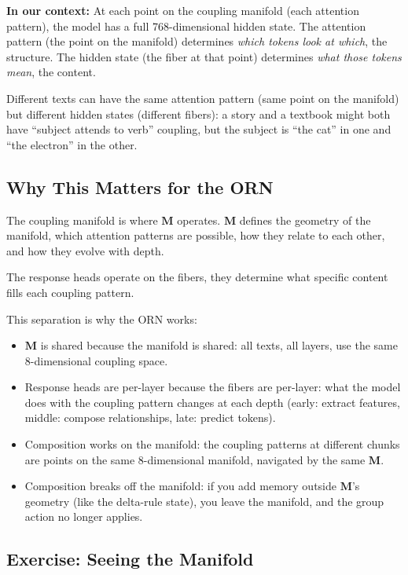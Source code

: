 \documentclass[11pt, a4paper]{article}
\newcommand{\M}{\mathbf{M}}
\theoremstyle{remark}
\begin{document}
\textbf{In our context:}
At each point on the coupling manifold (each attention pattern), the model has a full 768-dimensional hidden state.
The attention pattern (the point on the manifold) determines \emph{which tokens look at which}, the structure.
The hidden state (the fiber at that point) determines \emph{what those tokens mean}, the content.

Different texts can have the same attention pattern (same point on the manifold) but different hidden states (different fibers): a story and a textbook might both have ``subject attends to verb'' coupling, but the subject is ``the cat'' in one and ``the electron'' in the other.

\subsection{Why This Matters for the ORN}

The coupling manifold is where $\M$ operates.
$\M$ defines the geometry of the manifold, which attention patterns are possible, how they relate to each other, and how they evolve with depth.

The response heads operate on the fibers, they determine what specific content fills each coupling pattern.

This separation is why the ORN works:
\begin{itemize}[nosep]
    \item $\M$ is shared because the manifold is shared: all texts, all layers, use the same 8-dimensional coupling space.
    \item Response heads are per-layer because the fibers are per-layer: what the model does with the coupling pattern changes at each depth (early: extract features, middle: compose relationships, late: predict tokens).
    \item Composition works on the manifold: the coupling patterns at different chunks are points on the same 8-dimensional manifold, navigated by the same $\M$.
    \item Composition breaks off the manifold: if you add memory outside $\M$'s geometry (like the delta-rule state), you leave the manifold, and the group action no longer applies.
\end{itemize}

\subsection{Exercise: Seeing the Manifold}
\end{document}
